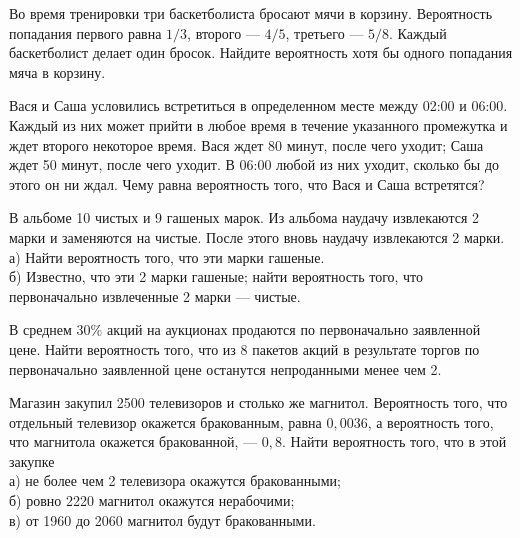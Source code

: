 \newpage\setcounter{zad}{0}



\begin{zkrW}{20}\noindent 
	Во время тренировки три баскетболиста бросают мячи в корзину. Вероятность попадания первого равна $1/3$, второго --- $4/5$, третьего --- $5/8$. Каждый баскетболист делает один бросок. Найдите вероятность хотя бы одного попадания мяча в корзину.
 
\end{zkrW}

\begin{zkrW}{20}\noindent 
	Вася и Саша условились встретиться в определенном месте между 02:00 и 06:00. Каждый из них может прийти в любое время в течение указанного промежутка и ждет второго некоторое время. Вася ждет 80 минут, после чего уходит; Саша ждет 50 минут, после чего уходит. В 06:00 любой из них уходит, сколько бы до этого он ни ждал. Чему равна вероятность того, что Вася и Саша встретятся?
 
\end{zkrW}

\begin{zkrW}{20}\noindent 
	В альбоме 10 чистых и 9 гашеных марок. Из альбома наудачу извлекаются 2 марки и заменяются на чистые. После этого вновь наудачу извлекаются 2 марки. \\ \indent а) Найти вероятность того, что эти марки гашеные. \\ \indent б) Известно, что эти 2 марки гашеные; найти вероятность того, что первоначально извлеченные 2 марки --- чистые.
 
\end{zkrW}

\begin{zkrW}{20}\noindent 
	В среднем $30\%$ акций на аукционах продаются по первоначально заявленной цене. Найти вероятность того, что из 8 пакетов акций в результате торгов по первоначально заявленной цене останутся непроданными менее чем 2.
 
\end{zkrW}

\begin{zkrW}{20}\noindent 
	Магазин закупил 2500 телевизоров и столько же магнитол. Вероятность того, что отдельный телевизор окажется бракованным, равна $0{,}0036$, а вероятность того, что магнитола окажется бракованной, --- $0{,}8$. Найти вероятность того, что в этой закупке \\ \indent а) не более чем 2 телевизора окажутся бракованными; \\ \indent б) ровно 2220 магнитол окажутся нерабочими; \\ \indent в) от 1960 до 2060 магнитол будут бракованными.
 
\end{zkrW}

